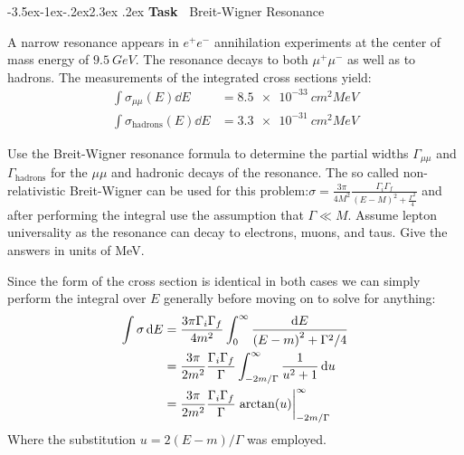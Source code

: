 \documentclass[12pt]{article}
\makeatletter
\def\section{\@startsection{section}{1}{\z@ }%
  {-3.5ex\@plus -1ex\@minus -.2ex}{2.3ex \@plus .2ex}%
  {\noindent\normalfont \Large \bfseries Task\ }%
}
\numberwithin{equation}{section}
\makeatother
\begin{document}
\section{Breit-Wigner Resonance}
\begin{problem}
  A narrow resonance appears in $e^+e^-$  annihilation experiments at the center of mass energy of $\SI{9.5}{GeV}$. The resonance decays to both $\mu^+\mu^-$ as well as to hadrons. The measurements of the integrated cross sections yield:
  \begin{align*}
    \int\sigma_{\mu\mu}(E)\dd{E}&=\SI{8.5e-33}{cm^2MeV}\\
    \int\sigma_{\text{hadrons}}(E)\dd{E}&=\SI{3.3e-31}{cm^2MeV}
  \end{align*}

  Use the Breit-Wigner resonance formula to determine the partial widths $\Gamma_{\mu\mu}$ and $\Gamma_{\text{hadrons}}$ for the $\mu\mu$ and hadronic decays of the resonance. The so called non-relativistic Breit-Wigner can be used for this problem:\@ $\sigma=\frac{3\pi}{4M^2}\frac{\Gamma_i\Gamma_f}{{(E-M)}^2+\frac{\Gamma^2}4}$ and after performing the integral use the assumption that $\Gamma\ll M$. Assume lepton universality as the resonance can decay to electrons, muons, and taus. Give the answers in units of \unit{MeV}.
\end{problem}
Since the form of the cross section is identical in both cases we can simply perform the integral over $E$ generally before moving on to solve for anything:
\begin{align*}
  \int\sigma\dd{E}&=\frac{3\pi\Gamma_i\Gamma_f}{4m^2}
  \int_0^\infty\frac{\dd{E}}{{(E-m)}^2+\Gamma^2/4}\\
  &=\frac{3\pi}{2m^2}\frac{\Gamma_i\Gamma_f}{\Gamma}
  \int_{-2m/\Gamma}^\infty\frac{1}{u^2+1}\dd{u}\\
  &=\frac{3\pi}{2m^2}\frac{\Gamma_i\Gamma_f}{\Gamma}
  \eval{\arctan(u)}_{-2m/\Gamma}^\infty
\end{align*}
Where the substitution $u=2(E-m)/\Gamma$ was employed.
\end{document}
